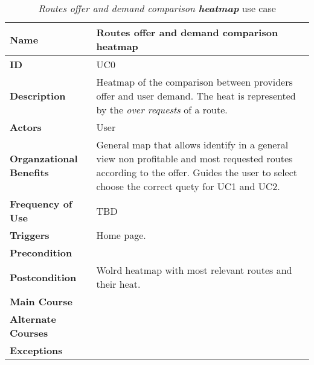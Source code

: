 \begin{table}
\begin{tabular}{|>{\raggedright\arraybackslash}p{3.2cm}|>{\raggedright\arraybackslash}p{10cm}|}
\hline
\textbf{Name}                   & Routes offer and demand comparison \textbf{heatmap} \\
\hline
\textbf{ID}                     & UC0 \\
\hline
\textbf{Description}            & Heatmap of the comparison between providers offer and user demand. The heat is represented by the \textit{over requests} of a route. \\
\hline
\textbf{Actors}                 & User \\
\hline
\textbf{Organzational Benefits} & General map that allows identify in a general view non profitable and most requested routes according to the offer. Guides the user to select choose the correct quety for UC1 and UC2. \\
\hline
\textbf{Frequency of Use}       & TBD \\
\hline
\textbf{Triggers}               & Home page. \\
\hline
\textbf{Precondition}           & \\
\hline
\textbf{Postcondition}          & Wolrd heatmap with most relevant routes and their heat. \\
\hline
\textbf{Main Course}            & \\
\hline
\textbf{Alternate Courses}      & \\
\hline
\textbf{Exceptions}             & \\
\hline
\end{tabular}
\caption{\textit{Routes offer and demand comparison \textbf{heatmap}} use case}
\label{UC0}
\end{table}

